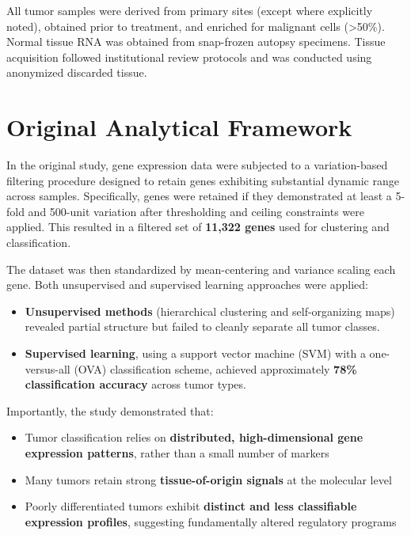\documentclass[
  letterpaper,
  DIV=11,
  numbers=noendperiod,
  openany,
  oneside]{scrreprt}
\providecommand{\tightlist}{%
  \setlength{\itemsep}{0pt}\setlength{\parskip}{0pt}}
\begin{document}
All tumor samples were derived from primary sites (except where
explicitly noted), obtained prior to treatment, and enriched for
malignant cells (\textgreater50\%). Normal tissue RNA was obtained from
snap-frozen autopsy specimens. Tissue acquisition followed institutional
review protocols and was conducted using anonymized discarded tissue.

\section{Original Analytical
Framework}\label{original-analytical-framework}

In the original study, gene expression data were subjected to a
variation-based filtering procedure designed to retain genes exhibiting
substantial dynamic range across samples. Specifically, genes were
retained if they demonstrated at least a 5-fold and 500-unit variation
after thresholding and ceiling constraints were applied. This resulted
in a filtered set of \textbf{11,322 genes} used for clustering and
classification.

The dataset was then standardized by mean-centering and variance scaling
each gene. Both unsupervised and supervised learning approaches were
applied:

\begin{itemize}
\tightlist
\item
  \textbf{Unsupervised methods} (hierarchical clustering and
  self-organizing maps) revealed partial structure but failed to cleanly
  separate all tumor classes.
\item
  \textbf{Supervised learning}, using a support vector machine (SVM)
  with a one-versus-all (OVA) classification scheme, achieved
  approximately \textbf{78\% classification accuracy} across tumor
  types.
\end{itemize}

Importantly, the study demonstrated that:

\begin{itemize}
\tightlist
\item
  Tumor classification relies on \textbf{distributed, high-dimensional
  gene expression patterns}, rather than a small number of markers\\
\item
  Many tumors retain strong \textbf{tissue-of-origin signals} at the
  molecular level\\
\item
  Poorly differentiated tumors exhibit \textbf{distinct and less
  classifiable expression profiles}, suggesting fundamentally altered
  regulatory programs
\end{itemize}
\end{document}
